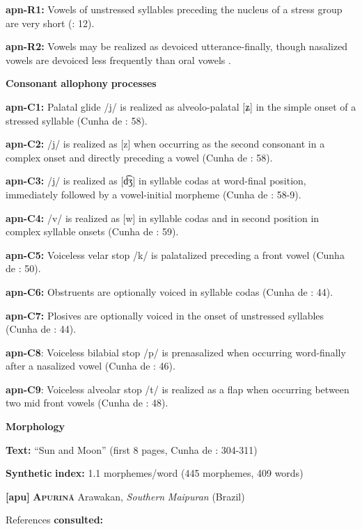 \textbf{apn-R1:} Vowels of unstressed syllables preceding the nucleus of a stress group are very short (\citealt{BurgessHam1968}: 12).

\textbf{apn-R2:} Vowels may be realized as devoiced utterance-finally, though nasalized vowels are devoiced less frequently than oral vowels \citep[7]{Ham2009}.

\textbf{Consonant} \textbf{allophony} \textbf{processes}

\textbf{apn-C1:} Palatal glide /j/ is realized as alveolo-palatal [ʑ] in the simple onset of a stressed syllable (Cunha de \citealt{Oliveira2005}: 58).

\textbf{apn-C2:} /j/ is realized as [z] when occurring as the second consonant in a complex onset and directly preceding a vowel (Cunha de \citealt{Oliveira2005}: 58).

\textbf{apn-C3:} /j/ is realized as [d͡ʒ] in syllable codas at word-final position, immediately followed by a vowel-initial morpheme (Cunha de \citealt{Oliveira2005}: 58-9).

\textbf{apn-C4:} /v/ is realized as [w] in syllable codas and in second position in complex syllable onsets (Cunha de \citealt{Oliveira2005}: 59).

\textbf{apn-C5:} Voiceless velar stop /k/ is palatalized preceding a front vowel (Cunha de \citealt{Oliveira2005}: 50).

\textbf{apn-C6:} Obstruents are optionally voiced in syllable codas (Cunha de \citealt{Oliveira2005}: 44).

\textbf{apn-C7:} Plosives are optionally voiced in the onset of unstressed syllables (Cunha de \citealt{Oliveira2005}: 44).

\textbf{apn-C8}: Voiceless bilabial stop /p/ is prenasalized when occurring word-finally after a nasalized vowel (Cunha de \citealt{Oliveira2005}: 46).

\textbf{apn-C9}: Voiceless alveolar stop /t/ is realized as a flap when occurring between two mid front vowels (Cunha de \citealt{Oliveira2005}: 48).

\textbf{Morphology}

\textbf{Text:} “Sun and Moon” (first 8 pages, Cunha de \citealt{Oliveira2005}: 304-311)

\textbf{Synthetic} \textbf{index:} 1.1 morphemes/word (445 morphemes, 409 words)

\textbf{[apu]}   \textbf{\textsc{Apurinã}}  Arawakan, \textit{Southern} \textit{Maipuran} (Brazil)

References \textbf{consulted:} \citet{Facundes2000}

